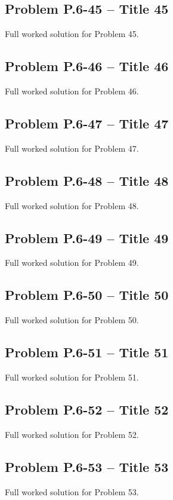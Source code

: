 \documentclass[12pt]{article}
\begin{document}
\subsection*{Problem P.6-45 – Title 45}
Full worked solution for Problem 45.


\subsection*{Problem P.6-46 – Title 46}
Full worked solution for Problem 46.


\subsection*{Problem P.6-47 – Title 47}
Full worked solution for Problem 47.


\subsection*{Problem P.6-48 – Title 48}
Full worked solution for Problem 48.


\subsection*{Problem P.6-49 – Title 49}
Full worked solution for Problem 49.


\subsection*{Problem P.6-50 – Title 50}
Full worked solution for Problem 50.


\subsection*{Problem P.6-51 – Title 51}
Full worked solution for Problem 51.


\subsection*{Problem P.6-52 – Title 52}
Full worked solution for Problem 52.


\subsection*{Problem P.6-53 – Title 53}
Full worked solution for Problem 53.
\end{document}
